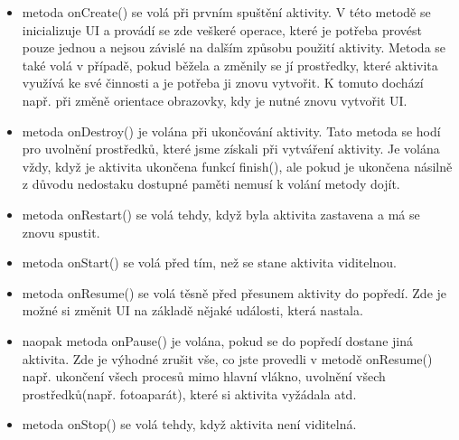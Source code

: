 \documentclass[12pt]{article}
\begin{document}
\begin{itemize}
\item metoda onCreate() se volá při prvním spuštění aktivity. V této metodě se inicializuje UI a provádí se zde veškeré operace, které je potřeba provést pouze jednou a nejsou závislé na dalším způsobu použití aktivity. Metoda se také volá v případě, pokud běžela a změnily se jí prostředky, které aktivita využívá ke své činnosti a je potřeba ji znovu vytvořit. K tomuto dochází např. při změně orientace obrazovky, kdy je nutné znovu vytvořit UI.
\item metoda onDestroy() je volána při ukončování aktivity. Tato metoda se hodí pro uvolnění prostředků, které jsme získali při vytváření aktivity. Je volána vždy, když je aktivita ukončena funkcí finish(), ale pokud je ukončena násilně z důvodu nedostaku dostupné paměti nemusí k volání metody dojít.
\item metoda onRestart() se volá tehdy, když byla aktivita zastavena a má se znovu spustit.
\item metoda onStart() se volá před tím, než se stane aktivita viditelnou.
\item metoda onResume() se volá těsně před přesunem aktivity do popředí. Zde je možné si změnit UI na základě nějaké události, která nastala.
\item naopak metoda onPause() je volána, pokud se do popředí dostane jiná aktivita. Zde je výhodné zrušit vše, co jste provedli v metodě onResume() např. ukončení všech procesů mimo hlavní vlákno, uvolnění všech prostředků(např. fotoaparát), které si aktivita vyžádala atd.
\item metoda onStop() se volá tehdy, když aktivita není viditelná.
\end{itemize}
\newpage
\end{document}
